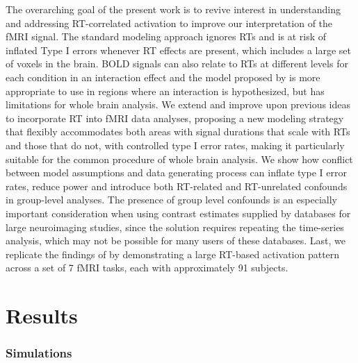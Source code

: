 \documentclass[sn-mathphys,Numbered, super, referee, lineno]{sn-jnl}
\begin{document}
The overarching goal of the present work is to revive interest in understanding and addressing RT-correlated activation to improve our interpretation of the fMRI signal.  The standard modeling approach ignores RTs and is at risk of inflated Type I errors whenever RT effects are present, which includes a large set of voxels in the brain. BOLD signals can also relate to RTs at different levels for each condition in an interaction effect and the model proposed by \citet{grinband_detection_2008} is more appropriate to use in regions where an interaction is hypothesized, but has limitations for whole brain analysis. We extend and improve upon previous ideas to incorporate RT into fMRI data analyses, proposing a new modeling strategy that flexibly accommodates both areas with signal durations that scale with RTs and those that do not, with controlled type I error rates, making it particularly suitable for the common procedure of whole brain analysis.  We show how conflict between model assumptions and data generating process can inflate type I error rates, reduce power and introduce both RT-related and RT-unrelated confounds in group-level analyses.  The presence of group level confounds is an especially important consideration when using contrast estimates supplied by databases for large neuroimaging studies, since the solution requires repeating the time-series analysis, which may not be possible for many users of these databases. Last, we replicate the findings of \citet{yarkoni_bold_2009} by demonstrating a large RT-based activation pattern across a set of 7 fMRI tasks, each with approximately 91 subjects. 







\section*{Results}

\subsubsection*{Simulations}
\end{document}
